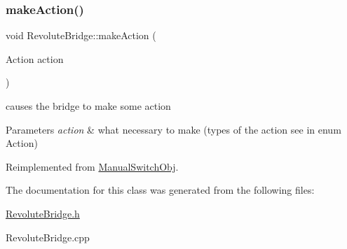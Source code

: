 \subsubsection{\texorpdfstring{make\+Action()}{makeAction()}}
{\footnotesize\ttfamily void Revolute\+Bridge\+::make\+Action (\begin{DoxyParamCaption}\item[{Action}]{action }\end{DoxyParamCaption})\hspace{0.3cm}{\ttfamily [virtual]}}



causes the bridge to make some action 


\begin{DoxyParams}{Parameters}
{\em action} & what necessary to make (types of the action see in enum Action) \\
\hline
\end{DoxyParams}


Reimplemented from \hyperlink{class_manual_switch_obj}{Manual\+Switch\+Obj}.



The documentation for this class was generated from the following files\+:\begin{DoxyCompactItemize}
\item 
\hyperlink{_revolute_bridge_8h}{Revolute\+Bridge.\+h}\item 
Revolute\+Bridge.\+cpp\end{DoxyCompactItemize}
